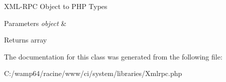 X\+M\+L-\/\+R\+PC Object to P\+HP Types


\begin{DoxyParams}{Parameters}
{\em object} & \\
\hline
\end{DoxyParams}
\begin{DoxyReturn}{Returns}
array 
\end{DoxyReturn}


The documentation for this class was generated from the following file\+:\begin{DoxyCompactItemize}
\item 
C\+:/wamp64/racine/www/ci/system/libraries/Xmlrpc.\+php\end{DoxyCompactItemize}

